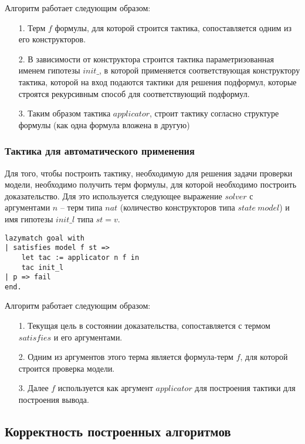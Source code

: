 \documentclass[12pt]{article}
\begin{document}
Алгоритм работает следующим образом:
\begin{enumerate}
    \item[1.] Терм $f$ формулы, для которой строится тактика, сопоставляется одним из его конструкторов.
    \item[2.] В зависимости от конструктора строится тактика параметризованная именем гипотезы $init\_$, в которой применяется соответствующая конструктору тактика, которой на вход подаются тактики для решения подформул, которые строятся рекурсивным способ для соответствующий подформул.
    \item[3.] Таким образом тактика $applicator$, строит тактику согласно структуре формулы (как одна формула вложена в другую)
\end{enumerate}


\subsubsection{Тактика для автоматического применения}
Для того, чтобы построить тактику, необходимую для решения задачи проверки модели, необходимо получить терм формулы, для которой необходимо построить доказательство. Для это используется следующее выражение $solver$ с аргументами $n$ -- терм типа $nat$ (количество конструкторов типа $state\ model$) и имя гипотезы $init\_l$ типа $st = v$.
\begin{verbatim}
lazymatch goal with
| satisfies model f st => 
    let tac := applicator n f in 
    tac init_l
| p => fail
end.
\end{verbatim}

Алгоритм работает следующим образом:
\begin{enumerate}
    \item[1.] Текущая цель в состоянии доказательства, сопоставляется с термом $satisfies$ и его аргументами.
    \item[2.] Одним из аргументов этого терма является формула-терм $f$, для которой строится проверка модели.
    \item[3.] Далее $f$ используется как аргумент $applicator$ для построения тактики для построения вывода.
\end{enumerate}


\subsection{Корректность построенных алгоритмов}
\end{document}
